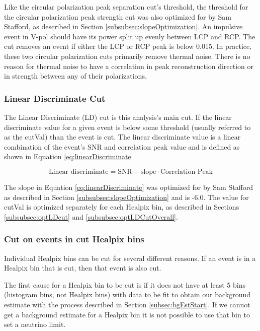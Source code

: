 Like the circular polarization peak separation cut's threshold, the threshold for the circular polarization peak strength cut was also optimized for by Sam Stafford, as described in Section \ref{subsubsec:slopeOptimization}.  An impulsive event in V-pol should have its power split up evenly between LCP and RCP.  The cut removes an event if either the LCP or RCP peak is below 0.015.  In practice, these two circular polarization cuts primarily remove thermal noise.  There is no reason for thermal noise to have a correlation in peak reconstruction direction or in strength between any of their polarizations.

\subsubsection{Linear Discriminate Cut}

The Linear Discriminate (LD) cut is this analysis's main cut.  If the linear discriminate value for a given event is below some threshold (usually referred to as the cutVal) than the event is cut.  The linear discriminate value is a linear combination of the event's SNR and correlation peak value and is defined as shown in Equation \ref{eq:linearDiscriminate}

\begin{equation} \label{eq:linearDiscriminate}
\textrm{Linear discriminate} = \textrm{SNR} - \textrm{slope} \cdot \textrm{Correlation Peak} 
\end{equation}

The slope in Equation \ref{eq:linearDiscriminate} was optimized for by Sam Stafford as described in Section \ref{subsubsec:slopeOptimization} and is -6.0.  The value for cutVal is optimized separately for each Healpix bin, as described in Sections \ref{subsubsec:optLDcut} and \ref{subsubsec:optLDCutOverall}.

\subsubsection{Cut on events in cut Healpix bins}

Individual Healpix bins can be cut for several different reasons.  If an event is in a Healpix bin that is cut, then that event is also cut. 

The first cause for a Healpix bin to be cut is if it does not have at least 5 bins (histogram bins, not Healpix bins) with data to be fit to obtain our background estimate with the process described in Section \ref{subsec:bgEstStart}.  If we cannot get a background estimate for a Healpix bin it is not possible to use that bin to set a neutrino limit.

